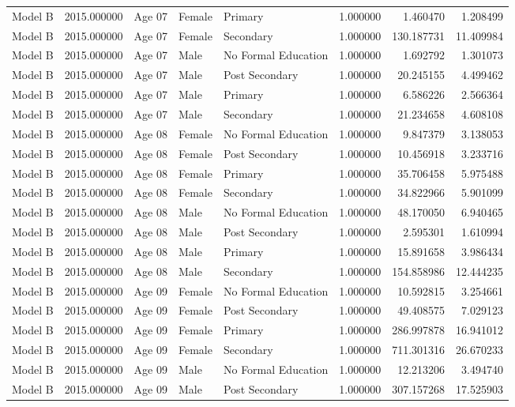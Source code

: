 \begin{table}[ht]
\begin{tabular}{lrlllrrr}
Model B & 2015.000000 & Age 07 & Female & Primary & 1.000000 & 1.460470 & 1.208499 \\
Model B & 2015.000000 & Age 07 & Female & Secondary & 1.000000 & 130.187731 & 11.409984 \\
Model B & 2015.000000 & Age 07 & Male & No Formal Education & 1.000000 & 1.692792 & 1.301073 \\
Model B & 2015.000000 & Age 07 & Male & Post Secondary & 1.000000 & 20.245155 & 4.499462 \\
Model B & 2015.000000 & Age 07 & Male & Primary & 1.000000 & 6.586226 & 2.566364 \\
Model B & 2015.000000 & Age 07 & Male & Secondary & 1.000000 & 21.234658 & 4.608108 \\
Model B & 2015.000000 & Age 08 & Female & No Formal Education & 1.000000 & 9.847379 & 3.138053 \\
Model B & 2015.000000 & Age 08 & Female & Post Secondary & 1.000000 & 10.456918 & 3.233716 \\
Model B & 2015.000000 & Age 08 & Female & Primary & 1.000000 & 35.706458 & 5.975488 \\
Model B & 2015.000000 & Age 08 & Female & Secondary & 1.000000 & 34.822966 & 5.901099 \\
Model B & 2015.000000 & Age 08 & Male & No Formal Education & 1.000000 & 48.170050 & 6.940465 \\
Model B & 2015.000000 & Age 08 & Male & Post Secondary & 1.000000 & 2.595301 & 1.610994 \\
Model B & 2015.000000 & Age 08 & Male & Primary & 1.000000 & 15.891658 & 3.986434 \\
Model B & 2015.000000 & Age 08 & Male & Secondary & 1.000000 & 154.858986 & 12.444235 \\
Model B & 2015.000000 & Age 09 & Female & No Formal Education & 1.000000 & 10.592815 & 3.254661 \\
Model B & 2015.000000 & Age 09 & Female & Post Secondary & 1.000000 & 49.408575 & 7.029123 \\
Model B & 2015.000000 & Age 09 & Female & Primary & 1.000000 & 286.997878 & 16.941012 \\
Model B & 2015.000000 & Age 09 & Female & Secondary & 1.000000 & 711.301316 & 26.670233 \\
Model B & 2015.000000 & Age 09 & Male & No Formal Education & 1.000000 & 12.213206 & 3.494740 \\
Model B & 2015.000000 & Age 09 & Male & Post Secondary & 1.000000 & 307.157268 & 17.525903 \\

\end{tabular}
\end{table}
